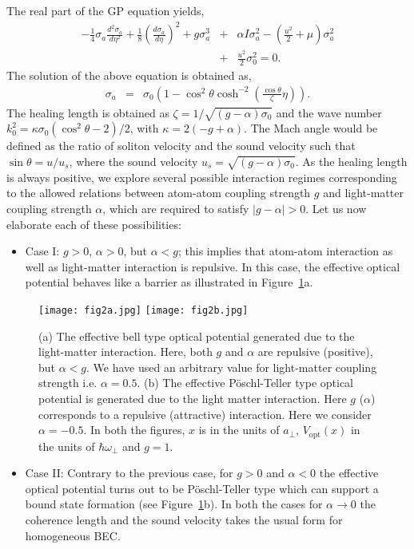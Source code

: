 \documentclass[epj]{svjour}
\begin{document}
The real part of the GP equation yields,
\begin{eqnarray}
-\frac{1}{4}\sigma_a\frac{d^2\sigma_a}{d\eta^2}+\frac{1}{8}\left(\frac{d\sigma_a}{d\eta}\right)^2+g\sigma_a^3 &+& \alpha I \sigma_a^2 -\left(\frac{u^2}{2}+\mu\right)\sigma_a^2\nonumber \\ &+& \frac{u^2}{2}\sigma_0^2=0.\label{real}
\end{eqnarray}
The solution of the above equation is obtained as,
\begin{eqnarray}\sigma_a &=& \sigma_0\left(1-\cos^2\theta\cosh^{-2}\left(\frac{\cos\theta}{\zeta}\eta\right)\right).\label{sol}
\end{eqnarray}
The healing length is obtained as $\zeta=1/\sqrt{(g-\alpha)\sigma_0}$ and the wave number $k_0^2=\kappa\sigma_0\left(\cos^2\theta-2\right)/2$, with $\kappa=2\left(-g+\alpha\right)$. The Mach angle would be defined as the ratio of soliton velocity and the sound velocity such that $\sin\theta=u/u_s$, where the sound velocity $u_s=\sqrt{(g-\alpha)\sigma_0}$. As the healing length is always positive, we explore several possible interaction regimes corresponding to  the allowed relations between atom-atom coupling strength $g$ and light-matter coupling strength $\alpha$, which are required to satisfy $|g-\alpha|>0$. Let us now elaborate each of these possibilities:
\begin{itemize}
\item{Case I}:  $g>0$, $\alpha>0$, but $\alpha<g$; this implies that atom-atom interaction as well as light-matter interaction is repulsive. In this case, the effective optical potential behaves like a barrier as illustrated in Figure~\ref{barrier}a.
\end{itemize}
\begin{figure}\centering
\texttt{[image: fig2a.jpg]}
\texttt{[image: fig2b.jpg]}
\caption{(a) The effective bell type optical potential generated due to the light-matter interaction. Here, both $g$ and $\alpha$ are repulsive (positive), but $\alpha<g$. We have used an arbitrary value for light-matter coupling strength i.e. $\alpha=0.5$. (b)  The effective P\"{o}schl-Teller type optical potential is generated due to the light matter interaction. Here $g$ ($\alpha$) corresponds to a  repulsive (attractive) interaction. Here we consider $\alpha=-0.5$. In both the figures, $x$ is in the units of $a_{\perp}$, $V_{\textrm{opt}}(x)$ in the units of $\hbar\omega_{\perp}$ and $g=1$.}\label{barrier}
\end{figure}
\begin{itemize}
\item{Case II}:  Contrary to the previous case, for $g>0$ and $\alpha<0$ the effective optical potential turns out to be P\"{o}schl-Teller type which can support a bound state formation (see Figure~\ref{barrier}b). In both the cases for $\alpha\rightarrow0$ the coherence length and the sound velocity takes the usual form for homogeneous BEC.
\end{itemize}
\end{document}
